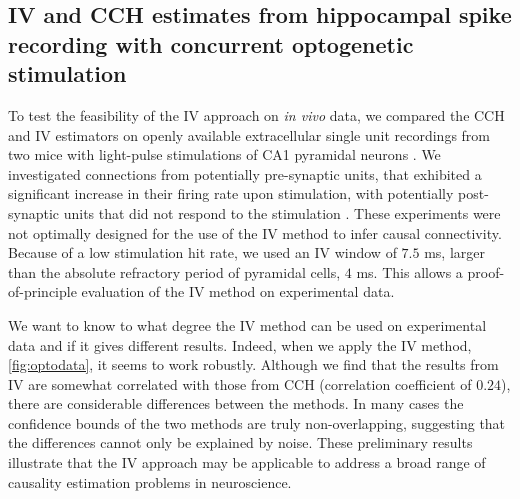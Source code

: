 \documentclass[11pt]{article}
\begin{document}
\subsection{IV and CCH estimates from hippocampal spike recording with concurrent optogenetic stimulation}
To test the feasibility of the IV approach on \textit{in vivo} data, we compared the CCH and IV estimators on openly available extracellular single unit recordings from two mice with light-pulse stimulations of CA1 pyramidal neurons \citep{English2017}.
We investigated connections from potentially pre-synaptic units, that exhibited a significant increase in their firing rate upon stimulation, with potentially post-synaptic units that did not respond to the stimulation \citep{English2017}. 
These experiments were not optimally designed for the use of the IV method to infer causal connectivity.
Because of a low stimulation hit rate, we used an IV window of $ 7.5 $ ms, larger than the absolute refractory period of pyramidal cells, $ 4 $ ms.
This allows a proof-of-principle evaluation of the IV method on experimental data.

We want to know to what degree the IV method can be used on experimental data and if it gives different results. 
Indeed, when we apply the IV method, \cref{fig:optodata}, it seems to work robustly. 
Although we find that the results from IV are somewhat correlated with those from CCH (correlation coefficient of $0.24$), there are considerable differences between the methods. 
In many cases the confidence bounds of the two methods are truly non-overlapping, suggesting that the differences cannot only be explained by noise. 
These preliminary results illustrate that the IV approach may be applicable to address a broad range of causality estimation problems in neuroscience.  
\end{document}
